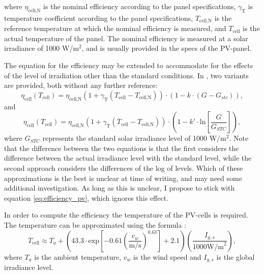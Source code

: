 where $\eta_{\text{cell,N}} $ is the nominal efficiency according to the panel specifications, $\gamma_{\text{T}}$ is temperature coefficient according to the panel specifications, $T_{\text{cell,N}}$ is the reference temperature at which the nominal efficiency is measured, and $T_{\text{cell}}$ is the actual temperature of the panel. The nominal efficiency is measured at a solar irradiance of 1000 W/$\text{m}^2$, and is usually provided in the specs of the PV-panel. 

The equation for the efficiency may be extended to accommodate for the effects of the level of irradiation other than the standard conditions. In \cite{SHC2020PVT}, two variants are provided, both without any further reference:
\begin{equation}
  \eta_{\text{cell}}(T_{\text{cell}}) = \eta_{\text{cell,N}} \left( 1 + \gamma_{\text{T}}\left(T_{\text{cell}} - T_{\text{cell,N}} \right) \right)\cdot (1-k\cdot(G - G_{stc})),
\end{equation}
and
\begin{equation}
  \eta_{\text{cell}}(T_{\text{cell}}) = \eta_{\text{cell,N}} \left( 1 + \gamma_{\text{T}}\left(T_{\text{cell}} - T_{\text{cell,N}} \right) \right)\cdot \left(1-k'\cdot \text{ln}\left[\frac{G}{G_{STC}}\right] \right),
\end{equation}
where $G_{STC}$ represents the standard solar irradiance level of 1000 W/$\text{m}^2$. Note that the difference between the two equations is that the first considers the difference between the actual irradiance level with the standard level, while the second approach considers the differences of the log of levels. Which of these approximations is the best is unclear at time of writing, and may need some additional investigation. As long as this is unclear, I propose to stick with equation \ref{eq:efficiency_pv}, which ignores this effect. 


In order to compute the efficiency the temperature of the PV-cells is required. The temperature can be approximated using the formula \cite{VanderSluys2021}:
\begin{equation}
	T_{\text{cell}} \approx T_a + \left( 43.3 \cdot \text{exp} \left[-0.61 \left(\frac{v_w}{\text{m/s}} \right)^{0.63} \right] + 2.1 \right)\left(\frac{I_{g,s}}{1000\text{W/m}^2} \right), 
\label{eq:temp_panel}
\end{equation}
where $T_a$ is the ambient temperature, $v_w$ is the wind speed and $I_{g,s}$ is the global irradiance level. 

